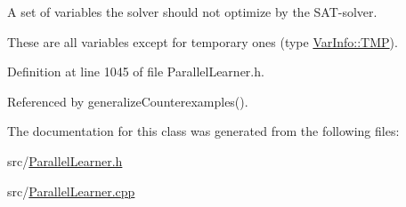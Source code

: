A set of variables the solver should not optimize by the S\-A\-T-\/solver. 

These are all variables except for temporary ones (type \hyperlink{classVarInfo_a64d1da76cf84fe674e5fef9764ef11cfa84a2d8d86f004930fe564dc5b395b29f}{Var\-Info\-::\-T\-M\-P}). 

Definition at line 1045 of file Parallel\-Learner.\-h.



Referenced by generalize\-Counterexamples().



The documentation for this class was generated from the following files\-:\begin{DoxyCompactItemize}
\item 
src/\hyperlink{ParallelLearner_8h}{Parallel\-Learner.\-h}\item 
src/\hyperlink{ParallelLearner_8cpp}{Parallel\-Learner.\-cpp}\end{DoxyCompactItemize}
